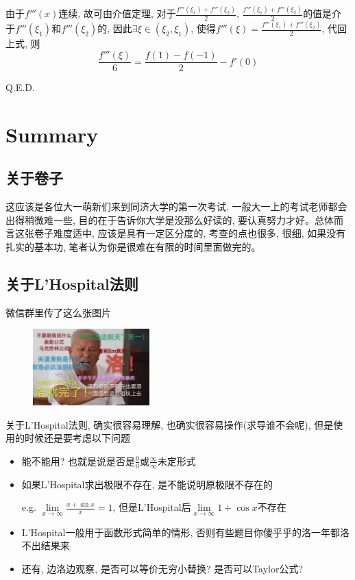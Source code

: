 \documentclass[10pt]{SelfArx} %
\numberwithin{dummy}{section}
\begin{document}
由于$f'''(x)$连续, 故可由介值定理, 对于$\displaystyle\frac{f'''(\xi_1)+f'''(\xi_2)}{2}$, $\displaystyle\frac{f'''(\xi_1)+f'''(\xi_2)}{2}$的值是介于$f'''(\xi_1)$和$f'''(\xi_2)$的, 因此$\exists\xi\in(\xi_2,\xi_1)$, 使得$f'''(\xi)=\displaystyle\frac{f'''(\xi_1)+f'''(\xi_2)}{2}$, 代回上式, 则
\begin{displaymath}
	\displaystyle\frac{f'''(\xi)}{6}=\displaystyle\frac{f(1)-f(-1)}{2}-f'(0)
\end{displaymath}

Q.E.D.
\section{Summary}
\subsection{关于卷子}
这应该是各位大一萌新们来到同济大学的第一次考试, 一般大一上的考试老师都会出得稍微难一些, 目的在于告诉你大学是没那么好读的, 要认真努力才好。总体而言这张卷子难度适中, 应该是具有一定区分度的, 考查的点也很多, 很细, 如果没有扎实的基本功, 笔者认为你是很难在有限的时间里面做完的。
\subsection{关于L'Hospital法则}
微信群里传了这么张图片
\begin{figure}[h]
	\centering
	\includegraphics[width=0.4\textwidth]{IMG_7085.jpg}
\end{figure}

关于L'Hospital法则, 确实很容易理解, 也确实很容易操作(求导谁不会呢), 但是使用的时候还是要考虑以下问题
\begin{itemize}
	\item 能不能用? 也就是说是否是$\displaystyle\frac{0}{0}$或$\displaystyle\frac{\infty}{\infty}$未定形式
	\item 如果L'Hospital求出极限不存在, 是不能说明原极限不存在的
	
	e.g. $\lim\limits_{x\to \infty}\displaystyle\frac{x+\sin x}{x}=1$, 但是L'Hospital后$\lim\limits_{x\to\infty}1+\cos x$不存在
	\item L'Hospital一般用于函数形式简单的情形, 否则有些题目你傻乎乎的洛一年都洛不出结果来
	\item 还有, 边洛边观察, 是否可以等价无穷小替换? 是否可以Taylor公式?
\end{itemize}
\end{document}
